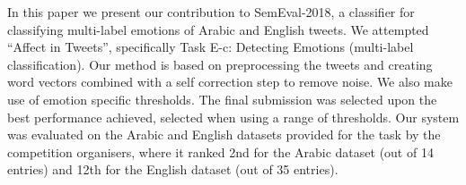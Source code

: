 In this paper we present our contribution to SemEval-2018, a classifier for classifying multi-label emotions of Arabic and English tweets. We attempted ``Affect in Tweets'', specifically Task E-c: Detecting Emotions (multi-label classification). Our method is based on preprocessing the tweets and creating word vectors combined with a self correction step to remove noise. We also make use of emotion specific thresholds. The final submission was selected upon the best performance achieved, selected when using a range of thresholds. Our system was evaluated on the Arabic and English datasets provided for the task by the competition organisers, where it ranked 2nd for the Arabic dataset (out of 14 entries) and 12th for the English dataset (out of 35 entries).
